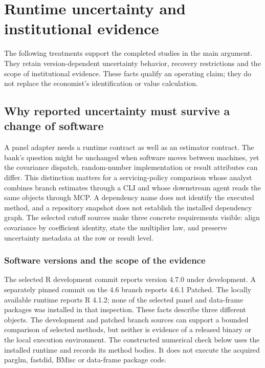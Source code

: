 \chapter{Runtime uncertainty and institutional evidence}
The following treatments support the completed studies in the main argument.
They retain version-dependent uncertainty behavior, recovery restrictions
and the scope of institutional evidence. These facts qualify an operating
claim; they do not replace the economist's identification or value calculation.



\section{Why reported uncertainty must survive a change of software}
\label{sec:exec29-panel-runtime-semantics}

A panel adapter needs a runtime contract as well as an estimator contract. The bank's question might be unchanged when software moves between machines, yet the covariance dispatch, random-number implementation or result attributes can differ. This distinction matters for a servicing-policy comparison whose analyst combines branch estimates through a CLI and whose downstream agent reads the same objects through MCP. A dependency name does not identify the executed method, and a repository snapshot does not establish the installed dependency graph. The selected cutoff sources make three concrete requirements visible: align covariance by coefficient identity, state the multiplier law, and preserve uncertainty metadata at the row or result level.~\citep{exec29_panel_runtime_sources}

\subsection{Software versions and the scope of the evidence}

The selected R development commit reports version 4.7.0 under development. A separately pinned commit on the 4.6 branch reports 4.6.1 Patched. The locally available runtime reports R 4.1.2; none of the selected panel and data-frame packages was installed in that inspection. These facts describe three different objects. The development and patched branch sources can support a bounded comparison of selected methods, but neither is evidence of a released binary or the local execution environment. The constructed numerical check below uses the installed runtime and records its method bodies. It does not execute the acquired parglm, fastdid, BMisc or data-frame package code.~\citep{exec29_panel_runtime_sources,exec29_panel_runtime_reference}

